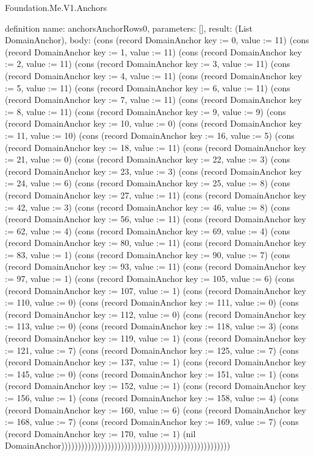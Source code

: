 \begin{lexlean}{Foundation.Me.V1.Anchors}
\begin{semanticmodule}
definition{
  name: anchorsAnchorRows0,
  parameters: [],
  result: (List DomainAnchor),
  body: (cons (record DomainAnchor {key := 0, value := 11}) (cons (record DomainAnchor {key := 1, value := 11}) (cons (record DomainAnchor {key := 2, value := 11}) (cons (record DomainAnchor {key := 3, value := 11}) (cons (record DomainAnchor {key := 4, value := 11}) (cons (record DomainAnchor {key := 5, value := 11}) (cons (record DomainAnchor {key := 6, value := 11}) (cons (record DomainAnchor {key := 7, value := 11}) (cons (record DomainAnchor {key := 8, value := 11}) (cons (record DomainAnchor {key := 9, value := 9}) (cons (record DomainAnchor {key := 10, value := 0}) (cons (record DomainAnchor {key := 11, value := 10}) (cons (record DomainAnchor {key := 16, value := 5}) (cons (record DomainAnchor {key := 18, value := 11}) (cons (record DomainAnchor {key := 21, value := 0}) (cons (record DomainAnchor {key := 22, value := 3}) (cons (record DomainAnchor {key := 23, value := 3}) (cons (record DomainAnchor {key := 24, value := 6}) (cons (record DomainAnchor {key := 25, value := 8}) (cons (record DomainAnchor {key := 27, value := 11}) (cons (record DomainAnchor {key := 42, value := 3}) (cons (record DomainAnchor {key := 46, value := 8}) (cons (record DomainAnchor {key := 56, value := 11}) (cons (record DomainAnchor {key := 62, value := 4}) (cons (record DomainAnchor {key := 69, value := 4}) (cons (record DomainAnchor {key := 80, value := 11}) (cons (record DomainAnchor {key := 83, value := 1}) (cons (record DomainAnchor {key := 90, value := 7}) (cons (record DomainAnchor {key := 93, value := 11}) (cons (record DomainAnchor {key := 97, value := 1}) (cons (record DomainAnchor {key := 105, value := 6}) (cons (record DomainAnchor {key := 107, value := 1}) (cons (record DomainAnchor {key := 110, value := 0}) (cons (record DomainAnchor {key := 111, value := 0}) (cons (record DomainAnchor {key := 112, value := 0}) (cons (record DomainAnchor {key := 113, value := 0}) (cons (record DomainAnchor {key := 118, value := 3}) (cons (record DomainAnchor {key := 119, value := 1}) (cons (record DomainAnchor {key := 121, value := 7}) (cons (record DomainAnchor {key := 125, value := 7}) (cons (record DomainAnchor {key := 137, value := 1}) (cons (record DomainAnchor {key := 145, value := 0}) (cons (record DomainAnchor {key := 151, value := 1}) (cons (record DomainAnchor {key := 152, value := 1}) (cons (record DomainAnchor {key := 156, value := 1}) (cons (record DomainAnchor {key := 158, value := 4}) (cons (record DomainAnchor {key := 160, value := 6}) (cons (record DomainAnchor {key := 168, value := 7}) (cons (record DomainAnchor {key := 169, value := 7}) (cons (record DomainAnchor {key := 170, value := 1}) (nil DomainAnchor)))))))))))))))))))))))))))))))))))))))))))))))))))
}


\end{semanticmodule}
\end{lexlean}
